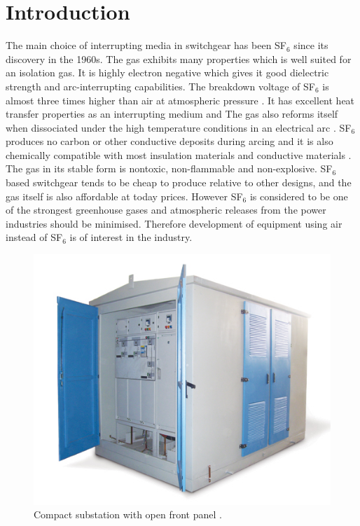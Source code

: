 \documentclass[10pt,a4paper,twoside]{article}
\begin{document}
\section{Introduction}
The main choice of interrupting media in switchgear has been SF$_6$ since its discovery in the 1960s. The gas exhibits many properties which is well suited for an isolation gas. It is highly electron negative which gives it good dielectric strength and arc-interrupting capabilities. The breakdown voltage of SF$_6$ is almost three times higher than air at atmospheric pressure \cite{bib:SF6PI}. It has excellent heat transfer properties as an interrupting medium and The gas also reforms itself when dissociated under the high temperature conditions in an electrical arc  \cite{bib:SF6PI}. SF$_6$ produces no carbon or other conductive deposits during arcing and it is also chemically compatible with most insulation materials and conductive materials \cite{bib:SF6PI}. The gas in its stable form is nontoxic, non-flammable and non-explosive. SF$_6$ based switchgear tends to be cheap to produce relative to other designs, and the gas itself is also affordable at today prices. However SF$_6$ is considered to be one of the strongest greenhouse gases and atmospheric releases from the power industries should be minimised. Therefore development of equipment using air instead of SF$_6$ is of interest in the industry.

\begin{figure} [h]
\centering
\includegraphics[scale=0.5]{Bilder/Introduction/general_substation.jpg}
\caption{Compact substation with open front panel \cite{bib:comSub}.} \label{fig:compact substation}
\end{figure}
\end{document}

